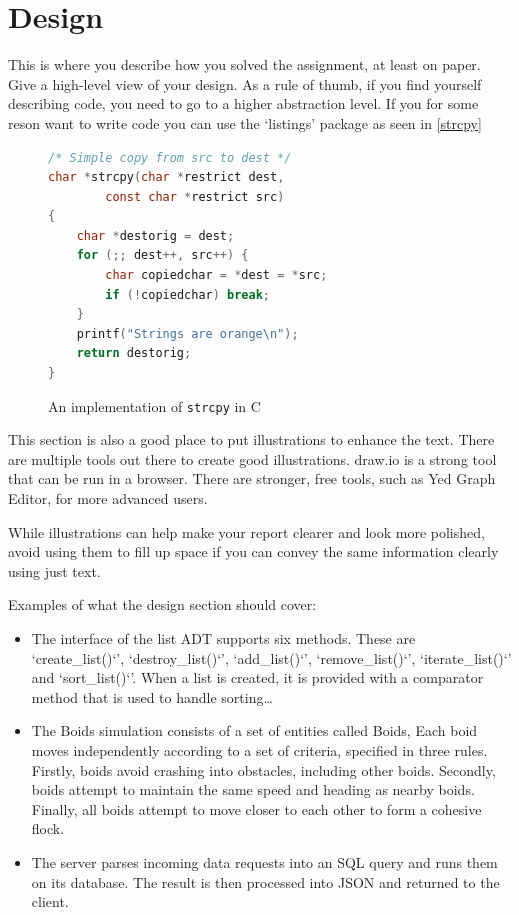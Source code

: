 \documentclass[conference]{IEEEtran}
\begin{document}
\section{Design}\label{Section:Design}
This is where you describe how you solved the assignment, at least on paper. Give a high-level view of your design.
As a rule of thumb, if you find yourself describing code, you need to go to a higher abstraction level. If you for some reson want to write code you can use the `listings' package as seen in \autoref{strcpy}

\begin{figure}[ht]
	\begin{lstlisting}[language=C, style=cStyle]
/* Simple copy from src to dest */
char *strcpy(char *restrict dest,
		const char *restrict src)
{
    char *destorig = dest;
    for (;; dest++, src++) {
		char copiedchar = *dest = *src;
		if (!copiedchar) break;
    }
	printf("Strings are orange\n");
    return destorig;
}
\end{lstlisting}
	\caption{An implementation of \lstinline{strcpy} in C}
	\label{strcpy}
\end{figure}

This section is also a good place to put illustrations to enhance the text.
There are multiple tools out there to create good illustrations.
draw.io is a strong tool that can be run in a browser. There are stronger, free tools, such as Yed Graph Editor, for more advanced users.

While illustrations can help make your report clearer and look more polished, avoid using them to fill up space if you can convey the same information clearly using just text.

Examples of what the design section should cover:

\begin{itemize}
	\item The interface of the list ADT supports six methods. These are `create\_list()`', `destroy\_list()`', `add\_list()`', `remove\_list()`', `iterate\_list()`' and `sort\_list()`'. When a list is created, it is provided with a comparator method that is used to handle sorting{\dots}
	\item The Boids simulation consists of a set of entities called Boids, Each boid moves independently according to a set of criteria, specified in three rules. Firstly, boids avoid crashing into obstacles, including other boids. Secondly, boids attempt to maintain the same speed and heading as nearby boids. Finally, all boids attempt to move closer to each other to form a cohesive flock.
	\item The server parses incoming data requests into an SQL query and runs them on its database. The result is then processed into JSON and returned to the client.
\end{itemize}
\end{document}
